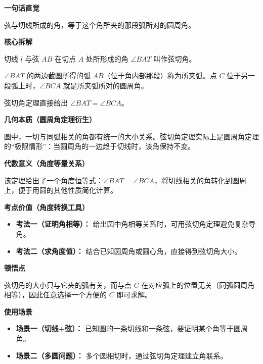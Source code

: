 \begin{explanationbox}
	\textbf{\textcolor{CExplanation}{一句话直觉}}

	弦与切线所成的角，等于这个角所夹的那段弧所对的圆周角。

	\medskip
	\textbf{\textcolor{CExplanation}{核心拆解}}
	\begin{description}[style=nextline, leftmargin=2.8em, labelsep=0.5em, itemsep=0.45em]
		\item[\textbf{要点一（弦切角定义）：}] 切线 $l$ 与弦 $AB$ 在切点 $A$ 处所形成的角 $\angle BAT$ 叫作弦切角。
		\item[\textbf{要点二（所夹弧与对应圆周角）：}] $\angle BAT$ 的两边截圆所得的弧 $AB$（位于角内部那段）称为所夹弧。点 $C$ 位于另一段弧上时，$\angle BCA$ 就是所夹弧所对的圆周角。
		\item[\textbf{要点三（相等关系）：}] 弦切角定理直接给出 $\angle BAT = \angle BCA$。
	\end{description}

	\medskip
	\textbf{\textcolor{CExplanation}{几何本质（圆周角定理衍生）}}

	圆中，一切与同弧相关的角都有统一的大小关系。弦切角定理实际上是圆周角定理的“极限情形”：当圆周角的一边趋于切线时，该角保持不变。

	\medskip
	\textbf{\textcolor{CExplanation}{代数意义（角度等量关系）}}

	该定理给出了一个角度恒等式：$\angle BAT = \angle BCA$，将切线相关的角转化到圆周上，便于用圆的其他性质简化计算。

	\medskip
	\textbf{\textcolor{CExplanation}{考点价值（角度转换工具）}}
	\begin{itemize}[leftmargin=*, itemsep=0.5em, topsep=0.4em]
		\item \textbf{考法一（证明角相等）：} 给出圆中角相等关系时，可用弦切角定理避免复杂导角。
		\item \textbf{考法二（求角度值）：} 结合已知圆周角或圆心角，直接得到弦切角大小。
	\end{itemize}

	\medskip
	\textbf{\textcolor{CExplanation}{顿悟点}}

	弦切角的大小只与它夹的弧有关，而与点 $C$ 在对应弧上的位置无关（同弧圆周角相等），因此任意选择一个方便的 $C$ 即可求解。

	\medskip
	\textbf{\textcolor{CExplanation}{使用场景}}
	\begin{itemize}[leftmargin=*, itemsep=0.5em, topsep=0.4em]
		\item \textbf{场景一（切线+弦）：} 已知圆的一条切线和一条弦，要证明某个角等于圆周角。
		\item \textbf{场景二（多圆问题）：} 多个圆相切时，通过弦切角定理建立角联系。
	\end{itemize}
\end{explanationbox}
